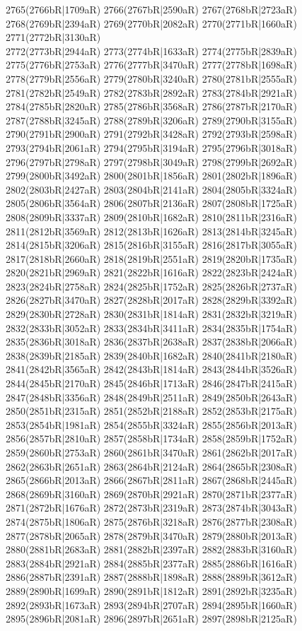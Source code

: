 2765(2766bR|1709aR) 2766(2767bR|2590aR) 2767(2768bR|2723aR) 2768(2769bR|2394aR) 2769(2770bR|2082aR) 2770(2771bR|1660aR) 2771(2772bR|3130aR) \\2772(2773bR|2944aR) 2773(2774bR|1633aR) 2774(2775bR|2839aR) 2775(2776bR|2753aR) 2776(2777bR|3470aR) 2777(2778bR|1698aR) 2778(2779bR|2556aR) 2779(2780bR|3240aR) 2780(2781bR|2555aR) \\2781(2782bR|2549aR) 2782(2783bR|2892aR) 2783(2784bR|2921aR) 2784(2785bR|2820aR) 2785(2786bR|3568aR) 2786(2787bR|2170aR) 2787(2788bR|3245aR) 2788(2789bR|3206aR) 2789(2790bR|3155aR) \\2790(2791bR|2900aR) 2791(2792bR|3428aR) 2792(2793bR|2598aR) 2793(2794bR|2061aR) 2794(2795bR|3194aR) 2795(2796bR|3018aR) 2796(2797bR|2798aR) 2797(2798bR|3049aR) 2798(2799bR|2692aR) \\2799(2800bR|3492aR) 2800(2801bR|1856aR) 2801(2802bR|1896aR) 2802(2803bR|2427aR) 2803(2804bR|2141aR) 2804(2805bR|3324aR) 2805(2806bR|3564aR) 2806(2807bR|2136aR) 2807(2808bR|1725aR) \\2808(2809bR|3337aR) 2809(2810bR|1682aR) 2810(2811bR|2316aR) 2811(2812bR|3569aR) 2812(2813bR|1626aR) 2813(2814bR|3245aR) 2814(2815bR|3206aR) 2815(2816bR|3155aR) 2816(2817bR|3055aR) \\2817(2818bR|2660aR) 2818(2819bR|2551aR) 2819(2820bR|1735aR) 2820(2821bR|2969aR) 2821(2822bR|1616aR) 2822(2823bR|2424aR) 2823(2824bR|2758aR) 2824(2825bR|1752aR) 2825(2826bR|2737aR) \\2826(2827bR|3470aR) 2827(2828bR|2017aR) 2828(2829bR|3392aR) 2829(2830bR|2728aR) 2830(2831bR|1814aR) 2831(2832bR|3219aR) 2832(2833bR|3052aR) 2833(2834bR|3411aR) 2834(2835bR|1754aR) \\2835(2836bR|3018aR) 2836(2837bR|2638aR) 2837(2838bR|2066aR) 2838(2839bR|2185aR) 2839(2840bR|1682aR) 2840(2841bR|2180aR) 2841(2842bR|3565aR) 2842(2843bR|1814aR) 2843(2844bR|3526aR) \\2844(2845bR|2170aR) 2845(2846bR|1713aR) 2846(2847bR|2415aR) 2847(2848bR|3356aR) 2848(2849bR|2511aR) 2849(2850bR|2643aR) 2850(2851bR|2315aR) 2851(2852bR|2188aR) 2852(2853bR|2175aR) \\2853(2854bR|1981aR) 2854(2855bR|3324aR) 2855(2856bR|2013aR) 2856(2857bR|2810aR) 2857(2858bR|1734aR) 2858(2859bR|1752aR) 2859(2860bR|2753aR) 2860(2861bR|3470aR) 2861(2862bR|2017aR) \\2862(2863bR|2651aR) 2863(2864bR|2124aR) 2864(2865bR|2308aR) 2865(2866bR|2013aR) 2866(2867bR|2811aR) 2867(2868bR|2445aR) 2868(2869bR|3160aR) 2869(2870bR|2921aR) 2870(2871bR|2377aR) \\2871(2872bR|1676aR) 2872(2873bR|2319aR) 2873(2874bR|3043aR) 2874(2875bR|1806aR) 2875(2876bR|3218aR) 2876(2877bR|2308aR) 2877(2878bR|2065aR) 2878(2879bR|3470aR) 2879(2880bR|2013aR) \\2880(2881bR|2683aR) 2881(2882bR|2397aR) 2882(2883bR|3160aR) 2883(2884bR|2921aR) 2884(2885bR|2377aR) 2885(2886bR|1616aR) 2886(2887bR|2391aR) 2887(2888bR|1898aR) 2888(2889bR|3612aR) \\2889(2890bR|1699aR) 2890(2891bR|1812aR) 2891(2892bR|3235aR) 2892(2893bR|1673aR) 2893(2894bR|2707aR) 2894(2895bR|1660aR) 2895(2896bR|2081aR) 2896(2897bR|2651aR) 2897(2898bR|2125aR) 